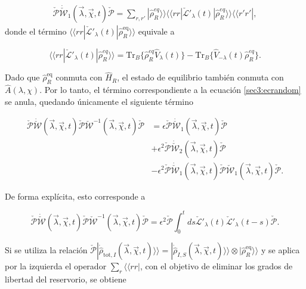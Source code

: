 \begin{appendixs}
\begin{align*}
    \check{\mathcal{P}}\dot{\check{\mathcal{W}}}_{1}(\vec{\lambda},\vec{\chi},t)\check{\mathcal{P}} = \sum_{r,r'}|\hat{\rho}^{eq}_{R} \rangle \rangle \langle \langle rr| \check{\mathcal{L}}'_{\lambda}(t)|\hat{\rho}_{R}^{eq}\rangle \rangle \langle \langle r'r'|,
\end{align*}
donde el término \(\langle\langle rr|\check{\mathcal{L}}'_{\lambda}(t)|\hat{\rho}_{R}^{\mathrm{eq}}\rangle\rangle\) equivale a

\begin{equation}
    \langle \langle rr|\check{\mathcal{L}}'_{\lambda}(t)|\hat{\rho}_{R}^{eq}\rangle \rangle  = \text{Tr}_{B}\{\hat{\rho}^{eq}_{R}\hat{V}_{\lambda}(t)\} - \text{Tr}_{B}\{\hat{V}_{-\lambda}(t)\hat{\rho}^{eq}_{R}\}.
    \label{sec3:ecrandom}
\end{equation}

Dado que \(\hat{\rho}_{R}^{\mathrm{eq}}\) conmuta con \(\hat{H}_{R}\), el estado de equilibrio también conmuta con \(\hat{A}(\lambda, \chi)\). Por lo tanto, el término correspondiente a la ecuación \ref{sec3:ecrandom} se anula, quedando únicamente el siguiente término

\begin{align*}
    \check{\mathcal{P}}\dot{\check{\mathcal{W}}}(\vec{\lambda},\vec{\chi},t)\check{\mathcal{P}}\check{\mathcal{W}}^{-1}(\vec{\lambda},\vec{\chi},t)\check{\mathcal{P}} & = \epsilon \check{\mathcal{P}}\dot{\check{\mathcal{W}}}_{1}(\vec{\lambda},\vec{\chi},t)\check{\mathcal{P}} \\
    & + \epsilon^{2}\check{\mathcal{P}}\dot{\check{\mathcal{W}}}_{2}(\vec{\lambda},\vec{\chi},t)\check{\mathcal{P}} \\
    & - \epsilon^{2}\check{\mathcal{P}}\dot{\check{\mathcal{W}}}_{1}(\vec{\lambda},\vec{\chi},t)\check{\mathcal{P}}  \check{\mathcal{W}}_{1}(\vec{\lambda},\vec{\chi},t) \check{\mathcal{P}}.
\end{align*}

De forma explícita, esto corresponde a 

\begin{equation*}
    \check{\mathcal{P}}\dot{\check{\mathcal{W}}}(\vec{\lambda},\vec{\chi},t)\check{\mathcal{P}}\check{\mathcal{W}}^{-1}(\vec{\lambda},\vec{\chi},t)\check{\mathcal{P}} = \epsilon^{2}\check{\mathcal{P}}\int_{0}^{t}ds \check{\mathcal{L}}'_{\lambda}(t)\check{\mathcal{L}}'_{\lambda}(t-s)\check{\mathcal{P}}. 
\end{equation*}

Si se utiliza la relación \(\check{\mathcal{P}}|\dot{\hat{\rho}}_{\mathrm{tot},I}(\vec{\lambda},\vec{\chi},t)\rangle\rangle = |\dot{\hat{\rho}}_{I,S}(\vec{\lambda},\vec{\chi},t)\rangle\rangle \otimes |\hat{\rho}_{R}^{\mathrm{eq}}\rangle\rangle\) y se aplica por la izquierda el operador \(\sum_{r} \langle\langle rr|\), con el objetivo de eliminar los grados de libertad del reservorio, se obtiene


\end{appendixs}
